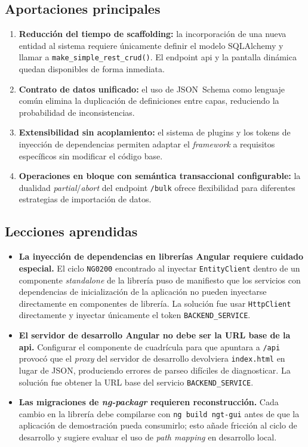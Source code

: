 \subsection{Aportaciones principales}
\label{subsec:aportaciones}

\begin{enumerate}
  \item \textbf{Reducción del tiempo de scaffolding:} la incorporación de una nueva
    entidad al sistema requiere únicamente definir el modelo SQLAlchemy y llamar a
    \texttt{make\_simple\_rest\_crud()}. El endpoint \gls{api} y la pantalla dinámica
    quedan disponibles de forma inmediata.
  \item \textbf{Contrato de datos unificado:} el uso de JSON~Schema como lenguaje común
    elimina la duplicación de definiciones entre capas, reduciendo la probabilidad de
    inconsistencias.
  \item \textbf{Extensibilidad sin acoplamiento:} el sistema de plugins y los tokens de
    inyección de dependencias permiten adaptar el \textit{framework} a requisitos
    específicos sin modificar el código base.
  \item \textbf{Operaciones en bloque con semántica transaccional configurable:} la
    dualidad \textit{partial}/\textit{abort} del endpoint \texttt{/bulk} ofrece
    flexibilidad para diferentes estrategias de importación de datos.
\end{enumerate}

\subsection{Lecciones aprendidas}
\label{subsec:lecciones}

\begin{itemize}
  \item \textbf{La inyección de dependencias en librerías Angular requiere cuidado
    especial.} El ciclo \texttt{NG0200} encontrado al inyectar \texttt{EntityClient}
    dentro de un componente \textit{standalone} de la librería puso de manifiesto que
    los servicios con dependencias de inicialización de la aplicación no pueden
    inyectarse directamente en componentes de librería. La solución fue usar
    \texttt{HttpClient} directamente y inyectar únicamente el token
    \texttt{BACKEND\_SERVICE}.
  \item \textbf{El servidor de desarrollo Angular no debe ser la URL base de la \gls{api}.}
    Configurar el componente de cuadrícula para que apuntara a \texttt{/api} provocó que
    el \textit{proxy} del servidor de desarrollo devolviera \texttt{index.html} en lugar
    de JSON, produciendo errores de parseo difíciles de diagnosticar. La solución fue
    obtener la URL base del servicio \texttt{BACKEND\_SERVICE}.
  \item \textbf{Las migraciones de \textit{ng-packagr} requieren reconstrucción.} Cada
    cambio en la librería debe compilarse con \texttt{ng build ngt-gui} antes de que la
    aplicación de demostración pueda consumirlo; esto añade fricción al ciclo de
    desarrollo y sugiere evaluar el uso de \textit{path mapping} en desarrollo local.
\end{itemize}

